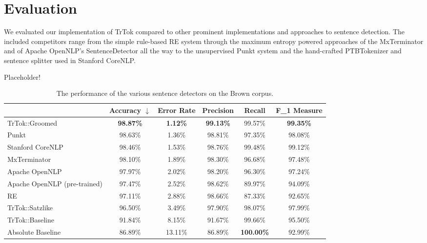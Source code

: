 \section{Evaluation}
\label{sec:eval}

We evaluated our implementation of TrTok compared to other prominent
implementations and approaches to sentence detection. The included
competitors range from the simple rule-based RE system through the
maximum entropy powered approaches of the MxTerminator and of Apache
OpenNLP's SentenceDetector all the way to the unsupervised Punkt
system and the hand-crafted PTBTokenizer and sentence splitter used in
Stanford CoreNLP.



Placeholder!\cite{sbd-punkt}

\begin{table*}
  \begin{center}
    \begin{tabular}{ | l | c | c | c | c | c | }
      \hline
      & Accuracy $\downarrow$ & Error Rate & Precision
      & Recall & F_1 Measure \\ \hline
      TrTok::Groomed & \textbf{98.87\%} & \textbf{1.12\%} & \textbf{99.13\%}
                     & 99.57\% & \textbf{99.35\%} \\ \hline
      Punkt & 98.63\% & 1.36\% & 98.81\%
            & 97.35\% & 98.08\% \\ \hline
      Stanford CoreNLP & 98.46\% & 1.53\% & 98.76\%
                       & 99.48\% & 99.12\% \\ \hline
      MxTerminator & 98.10\% & 1.89\% & 98.30\%
                   & 96.68\% & 97.48\% \\ \hline
      Apache OpenNLP & 97.97\% & 2.02\% & 98.20\%
                     & 96.30\% & 97.24\% \\ \hline
      Apache OpenNLP (pre-trained) & 97.47\% & 2.52\% & 98.62\%
                                   & 89.97\% & 94.09\% \\ \hline
      RE & 97.11\% & 2.88\% & 98.66\%
         & 87.33\% & 92.65\% \\ \hline
      TrTok::Satzlike & 96.50\% & 3.49\% & 97.90\%
                      & 98.07\% & 97.99\% \\ \hline
      TrTok::Baseline & 91.84\% & 8.15\% & 91.67\%
                      & 99.66\% & 95.50\% \\ \hline
      Absolute Baseline & 86.89\% & 13.11\% & 86.89\%
                        & \textbf{100.00\%} & 92.99\% \\ \hline
    \end{tabular}
  \end{center}
  \caption[Performance of sentence detectors on the Brown corpus]
    {The performance of the various sentence detectors on the Brown corpus.}
  \label{tbl:grand-melee}
\end{table*}
